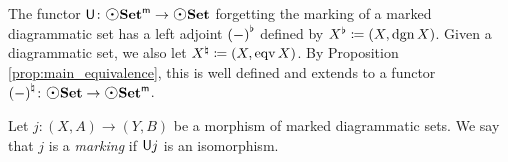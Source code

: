 \begin{dfn}
    The functor \( \fun{U} \colon \mdgmSet \to \dgmSet \) forgetting the marking of a marked diagrammatic set has a left adjoint \( {(-)}^{\flat} \) defined by \( {X}^{\flat} \coloneqq (X, \operatorname{dgn} X) \).
    Given a diagrammatic set, we also let \( {X}^{\natural} \coloneqq (X, \operatorname{eqv} X) \).
    By Proposition \ref{prop:main_equivalence}, this is well defined and extends to a functor \( \natmark{(-)} \colon \dgmSet \to \mdgmSet \). 
\end{dfn}

\begin{dfn} [Marking]
   Let \( j \colon (X, A) \to (Y, B) \) be a morphism of marked diagrammatic sets. 
   We say that \( j \) is a \emph{marking} if \( \mathsf{U}j \) is an isomorphism.
\end{dfn}


